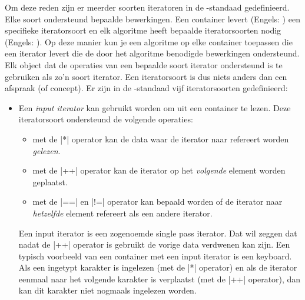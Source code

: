 \begin{cpplstShortInline}
Om deze reden zijn er meerder soorten iteratoren in de \Cpp{}\hyp{}standaad gedefinieerd.
Elke soort ondersteund bepaalde bewerkingen.
Een container levert (Engels: ) een specifieke iteratorsoort en elk algoritme heeft bepaalde iteratorsoorten nodig (Engels: ).
Op deze manier kun je een algoritme op elke container toepassen die een iterator levert die de door het algoritme benodigde bewerkingen ondersteund.
Elk object dat de operaties van een bepaalde soort iterator ondersteund is te gebruiken als zo'n soort iterator.
Een iteratorsoort is dus niets anders dan een afspraak (of concept).
Er zijn in de \Cpp{}\hyp{}standaad vijf iteratorsoorten gedefinieerd:
\begin{itemize}
	\item Een \emph{input iterator} kan gebruikt worden om uit een container te lezen.
	Deze iteratorsoort ondersteund de volgende operaties:
	\begin{itemize}
		\item met de |*| operator kan de data waar de iterator naar refereert worden \emph{gelezen}.
		\item met de |++| operator kan de iterator op het \emph{volgende} element worden geplaatst.
		\item met de |==| en |!=| operator kan bepaald worden of de iterator naar \emph{hetzelfde} element refereert als een andere iterator.\footnotemark{}
	\end{itemize}
	Een input iterator is een zogenoemde single pass iterator.
	Dat wil zeggen dat nadat de |++| operator is gebruikt de vorige data verdwenen kan zijn.
	Een typisch voorbeeld van een container met een input iterator is een keyboard.
	Als een ingetypt karakter is ingelezen (met de |*| operator) en als de iterator eenmaal naar het volgende karakter is verplaatst (met de |++| operator), dan kan dit karakter niet nogmaals ingelezen worden.

\end{itemize}
\end{cpplstShortInline}
